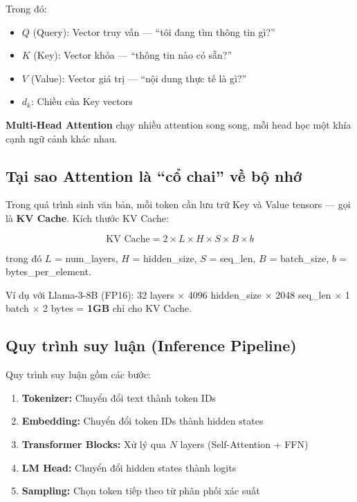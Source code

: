 \documentclass[12pt,a4paper]{report}
\begin{document}
Trong đó:
\begin{itemize}
  \item $Q$ (Query): Vector truy vấn --- ``tôi đang tìm thông tin gì?''
  \item $K$ (Key): Vector khóa --- ``thông tin nào có sẵn?''
  \item $V$ (Value): Vector giá trị --- ``nội dung thực tế là gì?''
  \item $d_k$: Chiều của Key vectors
\end{itemize}

\textbf{Multi-Head Attention} chạy nhiều attention song song, mỗi head học một khía cạnh ngữ cảnh khác nhau.

\subsection{Tại sao Attention là ``cổ chai'' về bộ nhớ}

Trong quá trình sinh văn bản, mỗi token cần lưu trữ Key và Value tensors --- gọi là \textbf{KV Cache}. Kích thước KV Cache:

\begin{equation}
\text{KV Cache} = 2 \times L \times H \times S \times B \times b
\end{equation}

trong đó $L$ = num\_layers, $H$ = hidden\_size, $S$ = seq\_len, $B$ = batch\_size, $b$ = bytes\_per\_element.

Ví dụ với Llama-3-8B (FP16): 32 layers $\times$ 4096 hidden\_size $\times$ 2048 seq\_len $\times$ 1 batch $\times$ 2 bytes = \textbf{1GB} chỉ cho KV Cache.

\subsection{Quy trình suy luận (Inference Pipeline)}

Quy trình suy luận gồm các bước:
\begin{enumerate}
  \item \textbf{Tokenizer:} Chuyển đổi text thành token IDs
  \item \textbf{Embedding:} Chuyển đổi token IDs thành hidden states
  \item \textbf{Transformer Blocks:} Xử lý qua $N$ layers (Self-Attention + FFN)
  \item \textbf{LM Head:} Chuyển đổi hidden states thành logits
  \item \textbf{Sampling:} Chọn token tiếp theo từ phân phối xác suất
\end{enumerate}
\end{document}
